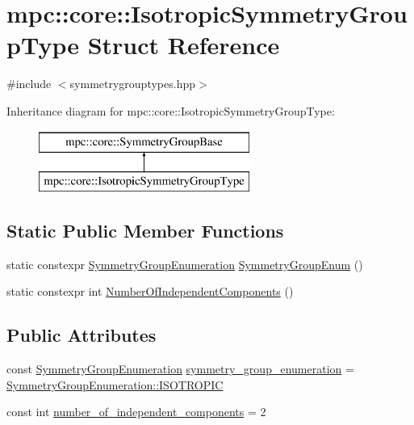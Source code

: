 \hypertarget{structmpc_1_1core_1_1_isotropic_symmetry_group_type}{}\section{mpc\+:\+:core\+:\+:Isotropic\+Symmetry\+Group\+Type Struct Reference}
\label{structmpc_1_1core_1_1_isotropic_symmetry_group_type}


{\ttfamily \#include $<$symmetrygrouptypes.\+hpp$>$}

Inheritance diagram for mpc\+:\+:core\+:\+:Isotropic\+Symmetry\+Group\+Type\+:\begin{figure}[H]
\begin{center}
\leavevmode
\includegraphics[height=2.000000cm]{structmpc_1_1core_1_1_isotropic_symmetry_group_type}
\end{center}
\end{figure}
\subsection*{Static Public Member Functions}
\begin{DoxyCompactItemize}
\item 
static constexpr \mbox{\hyperlink{namespacempc_1_1core_a9d979684062547055a0ef5c13077bad8}{Symmetry\+Group\+Enumeration}} \mbox{\hyperlink{structmpc_1_1core_1_1_isotropic_symmetry_group_type_a501a95dd5e13a62bff5cb9aff3428d47}{Symmetry\+Group\+Enum}} ()
\item 
static constexpr int \mbox{\hyperlink{structmpc_1_1core_1_1_isotropic_symmetry_group_type_a0afd9e5aa41efc5e90f43ef331996a92}{Number\+Of\+Independent\+Components}} ()
\end{DoxyCompactItemize}
\subsection*{Public Attributes}
\begin{DoxyCompactItemize}
\item 
const \mbox{\hyperlink{namespacempc_1_1core_a9d979684062547055a0ef5c13077bad8}{Symmetry\+Group\+Enumeration}} \mbox{\hyperlink{structmpc_1_1core_1_1_isotropic_symmetry_group_type_a44a0fdc0ed5b0027eb75b8d927d83c4b}{symmetry\+\_\+group\+\_\+enumeration}} = \mbox{\hyperlink{namespacempc_1_1core_a9d979684062547055a0ef5c13077bad8a099d59049574174a1c19567d38b479c2}{Symmetry\+Group\+Enumeration\+::\+I\+S\+O\+T\+R\+O\+P\+IC}}
\item 
const int \mbox{\hyperlink{structmpc_1_1core_1_1_isotropic_symmetry_group_type_a41134b104f375a339b0943df6959dbc9}{number\+\_\+of\+\_\+independent\+\_\+components}} = 2
\end{DoxyCompactItemize}



